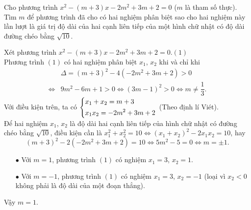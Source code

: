 \begin{ex}%
    Cho phương trình $x^2-(m+3)x-2m^2+3m+2=0$ ($m$ là tham số thực). Tìm $m$ để phương trình đã cho có hai nghiệm phân biệt sao cho hai nghiệm này lần lượt là giá trị độ dài của hai cạnh liên tiếp của một hình chữ nhật có độ dài đường chéo bằng $\sqrt{10}$.
\loigiai
    {Xét phương trình 
    $x^2-(m+3)x-2m^2+3m+2=0$.\hfill$(1)$\\
    Phương trình $(1)$ có hai nghiệm phân biệt $x_1$, $x_2$ khi và chỉ khi 
    {\allowdisplaybreaks
    \begin{align*}
    &\Delta=(m+3)^2-4(-2m^2+3m+2)>0\\
    \Leftrightarrow& 9m^2-6m+1>0\Leftrightarrow(3m-1)^2>0\Leftrightarrow m\neq\dfrac{1}{3}.
 \end{align*}}Với điều kiện trên, ta có $\left\{\begin{aligned}&x_1+x_2=m+3\\&x_1x_2=-2m^2+3m+2\end{aligned}\right.$ (Theo định lí Viét).\\
    Để hai nghiệm $x_1$, $x_2$ là độ dài hai cạnh liên tiếp của hình chữ nhật có đường chéo bằng $\sqrt{10}$, điều kiện cần là
    $x_1^2+x_2^2=10\Leftrightarrow (x_1+x_2)^2-2x_1x_2=10$, hay
    $$(m+3)^2-2(-2m^2+3m+2)=10\Leftrightarrow5m^2-5=0\Leftrightarrow m=\pm1.$$
    	\begin{enumerate}
    		\item[$\bullet$] Với $m=1$, phương trình $(1)$ có nghiệm $x_1=3$, $x_2=1.$
    		\item[$\bullet$] Với $m=-1$, phương trình $(1)$ có nghiệm $x_1=3$, $x_2=-1$ (loại vì $x_2<0$ không phải là độ dài của một đoạn thẳng).
    	\end{enumerate}
    Vậy $m=1$.
    }
\end{ex}

